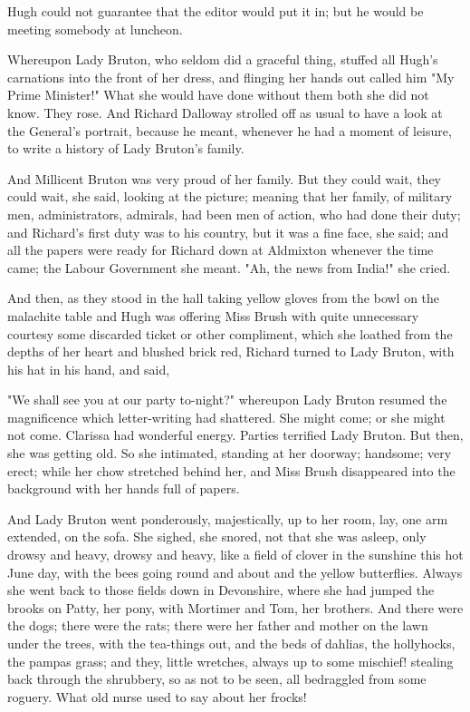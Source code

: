 \documentclass[lang=cn,10pt]{elegantbook}
\begin{document}
Hugh could not guarantee that the editor would put it in; but he
would be meeting somebody at luncheon.

Whereupon Lady Bruton, who seldom did a graceful thing, stuffed all
Hugh's carnations into the front of her dress, and flinging her
hands out called him "My Prime Minister!"  What she would have done
without them both she did not know.  They rose.  And Richard
Dalloway strolled off as usual to have a look at the General's
portrait, because he meant, whenever he had a moment of leisure, to
write a history of Lady Bruton's family.

And Millicent Bruton was very proud of her family.  But they could
wait, they could wait, she said, looking at the picture; meaning
that her family, of military men, administrators, admirals, had
been men of action, who had done their duty; and Richard's first
duty was to his country, but it was a fine face, she said; and all
the papers were ready for Richard down at Aldmixton whenever the
time came; the Labour Government she meant.  "Ah, the news from
India!" she cried.

And then, as they stood in the hall taking yellow gloves from the
bowl on the malachite table and Hugh was offering Miss Brush with
quite unnecessary courtesy some discarded ticket or other
compliment, which she loathed from the depths of her heart and
blushed brick red, Richard turned to Lady Bruton, with his hat in
his hand, and said,

"We shall see you at our party to-night?" whereupon Lady Bruton
resumed the magnificence which letter-writing had shattered.  She
might come; or she might not come.  Clarissa had wonderful energy.
Parties terrified Lady Bruton.  But then, she was getting old.  So
she intimated, standing at her doorway; handsome; very erect; while
her chow stretched behind her, and Miss Brush disappeared into the
background with her hands full of papers.

And Lady Bruton went ponderously, majestically, up to her room,
lay, one arm extended, on the sofa.  She sighed, she snored, not
that she was asleep, only drowsy and heavy, drowsy and heavy, like
a field of clover in the sunshine this hot June day, with the bees
going round and about and the yellow butterflies.  Always she went
back to those fields down in Devonshire, where she had jumped the
brooks on Patty, her pony, with Mortimer and Tom, her brothers.
And there were the dogs; there were the rats; there were her father
and mother on the lawn under the trees, with the tea-things out,
and the beds of dahlias, the hollyhocks, the pampas grass; and
they, little wretches, always up to some mischief! stealing back
through the shrubbery, so as not to be seen, all bedraggled from
some roguery.  What old nurse used to say about her frocks!
\end{document}
